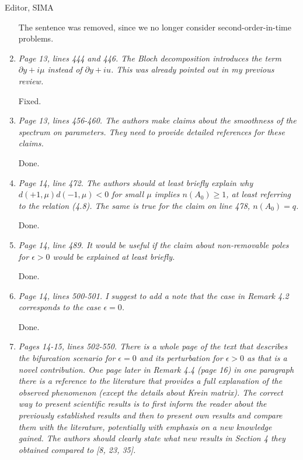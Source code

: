 \documentclass[11pt]{letter}
\begin{document}
\begin{letter}{Editor, SIMA}
\begin{enumerate}
The sentence was removed, since we no longer consider second-order-in-time problems.

\item \emph{Page 13, lines 444 and 446. The Bloch decomposition introduces the term $\partial y + i \mu$ instead of $\partial y + i u$. This was already pointed out in my previous review.}
\vspace{4mm}

Fixed.

\item \emph{Page 13, lines 456-460. The authors make claims about the smoothness of the spectrum on parameters. They need to provide detailed references for these claims.}
\vspace{4mm}

Done.

\item \emph{Page 14, line 472. The authors should at least briefly explain why $d(+1,\mu)d(-1,\mu) < 0$ for small $\mu$ implies $n(A_0) \geq 1$, at least referring to the relation (4.8). The same is true for the claim on line 478, $n(A_0) = q$.}
\vspace{4mm}

Done.

\item \emph{Page 14, line 489. It would be useful if the claim about non-removable poles for $\epsilon > 0$ would be explained at least briefly.}
\vspace{4mm}

Done.

\item \emph{Page 14, lines 500-501. I suggest to add a note that the case in Remark 4.2 corresponds to the case $\epsilon = 0$.}
\vspace{4mm}

Done.

\item \emph{Pages 14-15, lines 502-550. There is a whole page of the text that describes the bifurcation scenario for $\epsilon = 0$ and its perturbation for $\epsilon > 0$ as that is a novel contribution. One page later in Remark 4.4 (page 16) in one paragraph there is a reference to the literature that provides a full explanation of the observed phenomenon (except the details about Krein matrix). The correct way to present scientific results is to first inform the reader about the previously established results and then to present own results and compare them with the literature, potentially with emphasis on a new knowledge gained. The authors should clearly state what new results in Section 4 they obtained compared to [8, 23, 35].}
\vspace{4mm}


\end{enumerate}
\end{letter}
\end{document}

